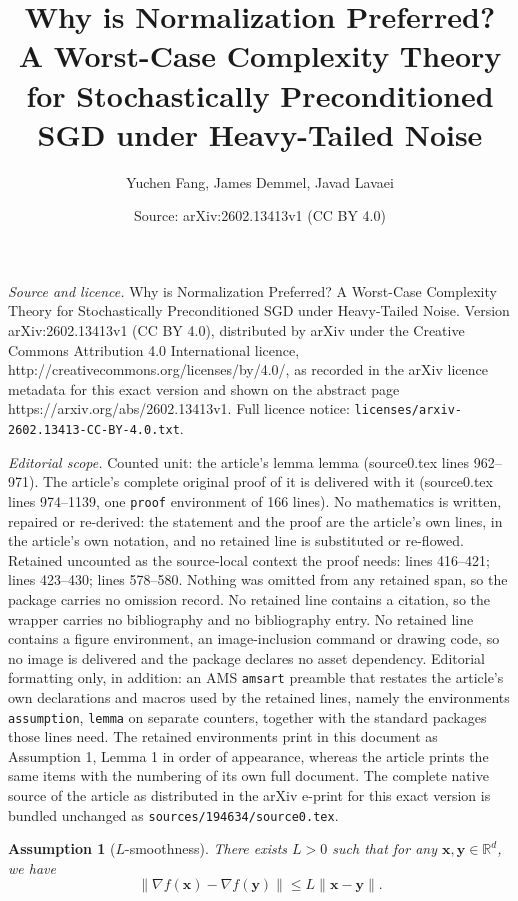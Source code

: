 \documentclass[10pt,a4paper]{amsart}
\title{Why is Normalization Preferred? A Worst-Case Complexity Theory for Stochastically Preconditioned SGD under Heavy-Tailed Noise}
\author{Yuchen Fang, James Demmel, Javad Lavaei}
\date{Source: arXiv:2602.13413v1 (CC BY 4.0)}
\newtheorem{assumption}{Assumption}
\newcommand{\bx}{\boldsymbol{x}}
\begin{document}
\maketitle

\noindent\emph{Source and licence.} Why is Normalization Preferred? A Worst-Case Complexity Theory for Stochastically Preconditioned SGD under Heavy-Tailed Noise. Version arXiv:2602.13413v1 (CC BY 4.0), distributed by arXiv under the Creative Commons Attribution 4.0 International licence, http://creativecommons.org/licenses/by/4.0/, as recorded in the arXiv licence metadata for this exact version and shown on the abstract page https://arxiv.org/abs/2602.13413v1. Full licence notice: \texttt{licenses/arxiv-2602.13413-CC-BY-4.0.txt}.\par\smallskip

\noindent\textit{Editorial scope.} Counted unit: the article's lemma lemma (source0.tex lines 962--971). The article's complete original proof of it is delivered with it (source0.tex lines 974--1139, one \texttt{proof} environment of 166 lines). No mathematics is written, repaired or re-derived: the statement and the proof are the article's own lines, in the article's own notation, and no retained line is substituted or re-flowed.  Retained uncounted as the source-local context the proof needs: lines 416--421; lines 423--430; lines 578--580.  Nothing was omitted from any retained span, so the package carries no omission record.  No retained line contains a citation, so the wrapper carries no bibliography and no bibliography entry.  No retained line contains a figure environment, an image-inclusion command or drawing code, so no image is delivered and the package declares no asset dependency.  Editorial formatting only, in addition: an AMS \texttt{amsart} preamble that restates the article's own declarations and macros used by the retained lines, namely the environments \texttt{assumption}, \texttt{lemma} on separate counters, together with the standard packages those lines need.  The retained environments print in this document as Assumption 1, Lemma 1 in order of appearance, whereas the article prints the same items with the numbering of its own full document.  The complete native source of the article as distributed in the arXiv e-print for this exact version is bundled unchanged as \texttt{sources/194634/source0.tex}.
\begin{assumption}[$L$-smoothness]\label{assumption2}
There exists $L > 0$ such that for any $\bx, \boldsymbol{y} \in \mathbb{R}^d$, we have
\begin{equation*}
  \|\nabla f(\boldsymbol{x}) - \nabla f(\boldsymbol{y})\| \leq L \|\bx - \boldsymbol{y}\|.  
\end{equation*}
\end{assumption}
\end{document}
